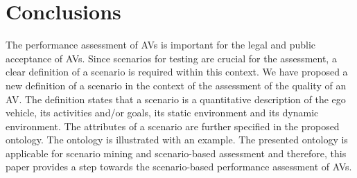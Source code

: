 \section{Conclusions}
\label{sec:conclusion}

The performance assessment of AVs is important for the legal and public acceptance of AVs. 
Since scenarios for testing are crucial for the assessment, a clear definition of a scenario is required within this context. 
We have proposed a new definition of a scenario in the context of the assessment of the quality of an AV. 
The definition states that a scenario is a quantitative description of the ego vehicle, its activities and/or goals, its static environment and its dynamic environment. 
The attributes of a scenario are further specified in the proposed ontology.
The ontology is illustrated with an example.
The presented ontology is applicable for scenario mining and scenario-based assessment and therefore, this paper provides a step towards the scenario-based performance assessment of AVs. 


